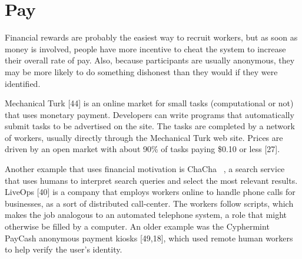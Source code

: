 \documentclass{acm_proc_article-sp}
\begin{document}
\section*{Pay}
Financial rewards are probably the easiest way to recruit workers, but as soon as money is involved, people have more incentive to cheat the system to increase their overall rate of pay. Also, because participants are usually anonymous, they may be more likely to do something dishonest than they would if they were identified.

Mechanical Turk [44] is an online market for small tasks (computational or not) that uses monetary payment. Developers can write programs that automatically submit tasks to be advertised on the site. The tasks are completed by a network of workers, usually directly through the Mechanical Turk web site. Prices are driven by an open market with about 90\% of tasks paying \$0.10 or less [27].

Another example that uses financial motivation is ChaCha ~\cite{chen2010}, a search service that uses humans to interpret search queries and select the most relevant results. LiveOps [40] is a company that employs workers online to handle phone calls for businesses, as a sort of distributed call-center. The workers follow scripts, which makes the job analogous to an automated telephone system, a role that might otherwise be filled by a computer. An older example was the Cyphermint PayCash anonymous payment kiosks [49,18], which used remote human workers to help verify the user's identity.
\end{document}
